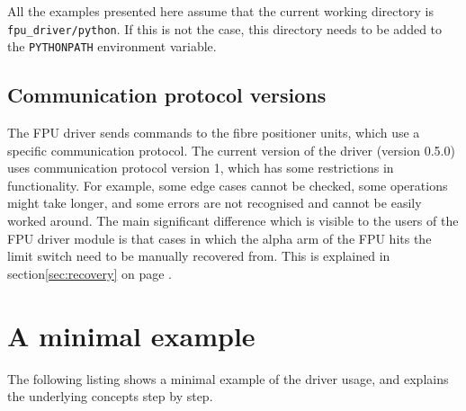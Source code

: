 \documentclass{scrartcl}[12pt,a4paper]
\begin{document}
All the examples presented here assume that the current working
directory is \texttt{fpu\_driver/python}. If this is not the case,
this directory needs to be added to the \texttt{PYTHONPATH}
environment variable.


\subsection{Communication protocol versions}

The FPU driver sends commands to the fibre positioner units, which use
a specific communication protocol.  The current version of the driver
(version 0.5.0) uses communication protocol version 1, which has some
restrictions in functionality. For example, some edge cases cannot be
checked, some operations might take longer, and some errors are not
recognised and cannot be easily worked around. The main significant
difference which is visible to the users of the FPU driver module is
that cases in which the alpha arm of the FPU hits the limit switch
need to be manually recovered from. This is explained in
section\ref{sec:recovery} on page \pageref{sec:recovery}.


\section{A minimal example}

The following listing shows a minimal example of the
driver usage, and explains the underlying concepts
step by step.
\end{document}
